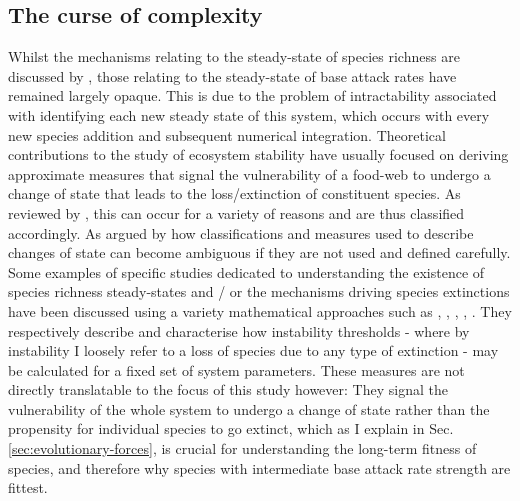\documentclass[a4paper]{report}
\begin{document}
\subsection{The curse of complexity}
 Whilst the mechanisms relating to the steady-state of species richness are discussed by \citep{Rossberg2013}, those relating to the steady-state of base attack rates have remained largely opaque. This is due to the problem of intractability associated with identifying each new steady state of this system, which occurs with every new species addition and subsequent numerical integration. Theoretical contributions to the study of ecosystem stability have usually focused on deriving approximate measures that signal the vulnerability of a food-web to undergo a change of state that leads to the loss/extinction of constituent species. As reviewed by \citep{Landi2018}, this can occur for a variety of reasons and are thus classified accordingly. As argued by \citep{Grimm1997} how classifications and measures used to describe changes of state can become ambiguous if they are not used and defined carefully. Some examples of specific studies dedicated to understanding the existence of species richness steady-states and / or the mechanisms driving species extinctions have been discussed using a variety mathematical approaches such as \citep{Rossberg2013}, \citep{Pawar2015}, \citep{Pawar2009}, \citep{Bastolla2005a}, \citep{Bastolla2005b}. They respectively describe and characterise how instability thresholds - where by instability I loosely refer to a loss of species due to any type of extinction - may be calculated for a fixed set of system parameters. These measures are not directly translatable to the focus of this study however: They signal the vulnerability of the whole system to undergo a change of state rather than the propensity for individual species to go extinct, which as I explain in Sec. \ref{sec:evolutionary-forces}, is crucial for understanding the long-term fitness of species, and therefore why species with intermediate base attack rate strength are fittest. \\
 
\end{document}
